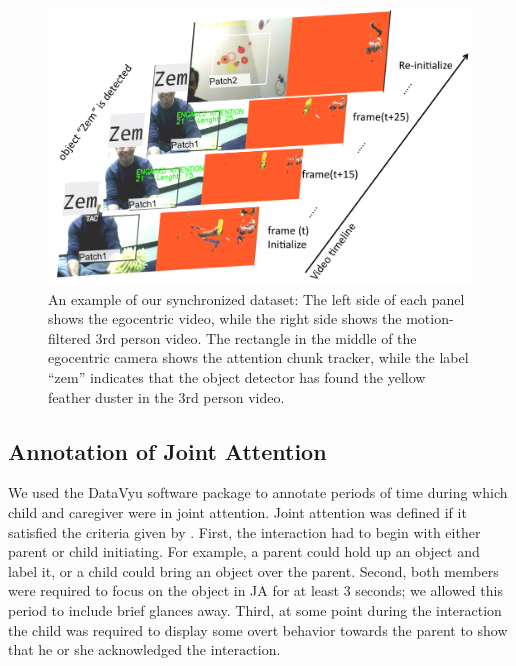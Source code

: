 \documentclass[10pt,letterpaper]{article}
\begin{document}
\begin{figure}[t]
     \begin{center}
           \includegraphics[width=1\linewidth]{Image/cogsci} 
          \end{center}
    \caption{An example of our synchronized dataset: The left side of each panel shows the egocentric video, while the right side shows the motion-filtered 3rd person video. The rectangle in the middle of the egocentric camera shows the attention chunk tracker, while the label ``zem'' indicates that the object detector has found the yellow feather duster in the 3rd person video.}
   \label{fig:main}
\end{figure}

\subsection{Annotation of Joint Attention}

We used the DataVyu software package \cite{adolph2012} to annotate periods of time during which child and caregiver were in joint attention. Joint attention was defined if it satisfied the criteria given by \cite{tomasello1983}. First, the interaction had to begin with either parent or child initiating. For example, a parent could hold up an object and label it, or a child could bring an object over the parent. Second, both members were required to focus on the object in JA for at least 3 seconds; we allowed this period to include brief glances away. Third, at some point during the interaction the child was required to display some overt behavior towards the parent to show that he or she acknowledged the interaction.
\end{document}
